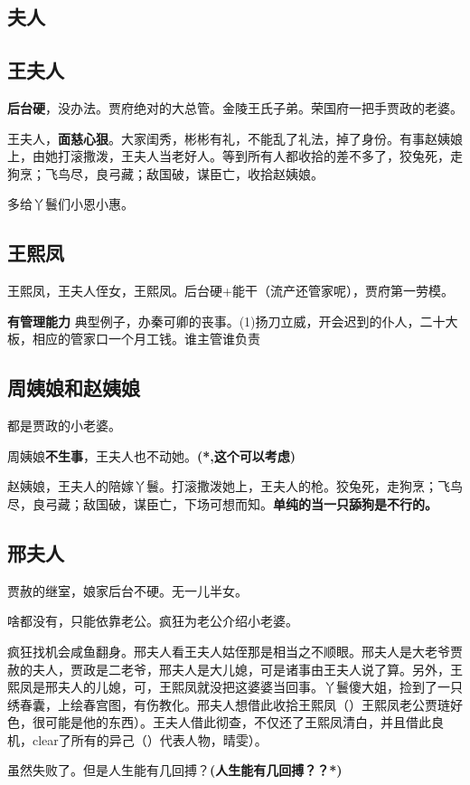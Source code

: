 \documentclass[conference]{IEEEtran}
\begin{document}
\begin{CJK*}{UTF8}{song}
\section{夫人}
\subsection{王夫人}
\textbf{后台硬}，没办法。贾府绝对的大总管。金陵王氏子弟。荣国府一把手贾政的老婆。

王夫人，\textbf{面慈心狠}。大家闺秀，彬彬有礼，不能乱了礼法，掉了身份。有事赵姨娘上，由她打滚撒泼，王夫人当老好人。等到所有人都收拾的差不多了，狡兔死，走狗烹；飞鸟尽，良弓藏；敌国破，谋臣亡，收拾赵姨娘。	

多给丫鬟们小恩小惠。

\subsection{王熙凤}
王熙凤，王夫人侄女，王熙凤。后台硬+能干（流产还管家呢），贾府第一劳模。

\textbf{有管理能力} 典型例子，办秦可卿的丧事。(1)扬刀立威，开会迟到的仆人，二十大板，相应的管家口一个月工钱。谁主管谁负责

\subsection{周姨娘和赵姨娘}
都是贾政的小老婆。

周姨娘\textbf{不生事}，王夫人也不动她。\textbf{(*,这个可以考虑)}

赵姨娘，王夫人的陪嫁丫鬟。打滚撒泼她上，王夫人的枪。狡兔死，走狗烹；飞鸟尽，良弓藏；敌国破，谋臣亡，下场可想而知。\textbf{单纯的当一只舔狗是不行的。}

\subsection{邢夫人}
贾赦的继室，娘家后台不硬。无一儿半女。

啥都没有，只能依靠老公。疯狂为老公介绍小老婆。

疯狂找机会咸鱼翻身。邢夫人看王夫人姑侄那是相当之不顺眼。邢夫人是大老爷贾赦的夫人，贾政是二老爷，邢夫人是大儿媳，可是诸事由王夫人说了算。另外，王熙凤是邢夫人的儿媳，可，王熙凤就没把这婆婆当回事。丫鬟傻大姐，捡到了一只绣春囊，上绘春宫图，有伤教化。邢夫人想借此收拾王熙凤（）王熙凤老公贾琏好色，很可能是他的东西）。王夫人借此彻查，不仅还了王熙凤清白，并且借此良机，clear了所有的异己（）代表人物，晴雯）。

虽然失败了。但是人生能有几回搏？\textbf{(人生能有几回搏？？*)}


\end{CJK*}
\end{document}
